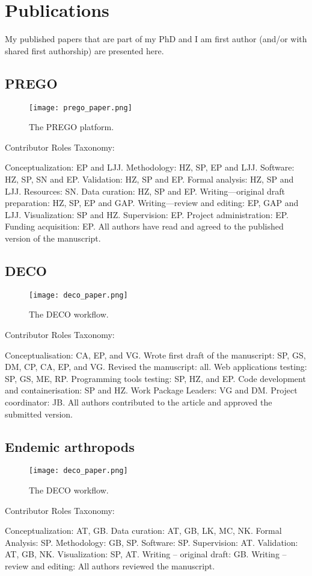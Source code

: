 \chapter{Publications}
\label{app:publications}

My published papers that are part of my PhD and I am first author (and/or with shared first authorship) are
presented here.
\section{PREGO}

\begin{figure}[hbt!] 
    \centering\texttt{[image: prego\_paper.png]}
\caption{The PREGO platform.}
    \label{fig:prego_paper}
\end{figure}

Contributor Roles Taxonomy:

Conceptualization: EP and LJJ.
Methodology: HZ, SP, EP and LJJ.
Software: HZ, SP, SN and EP.
Validation: HZ, SP and EP.
Formal analysis: HZ, SP and LJJ.
Resources: SN.
Data curation: HZ, SP and EP.
Writing—original draft preparation: HZ, SP, EP and GAP.
Writing—review and editing: EP, GAP and LJJ.
Visualization: SP and HZ.
Supervision: EP.
Project administration: EP.
Funding acquisition: EP.
All authors have read and agreed to the published version of the manuscript.


\section{DECO}

\begin{figure}[hbt!] 
    \centering\texttt{[image: deco\_paper.png]}
\caption{The DECO workflow.}
    \label{fig:deco_paper}
\end{figure}

Contributor Roles Taxonomy:

Conceptualisation: CA, EP, and VG.
Wrote first draft of the manuscript: SP, GS, DM, CP, CA, EP, and VG.
Revised the manuscript: all.
Web applications testing: SP, GS, ME, RP.
Programming tools testing: SP, HZ, and EP.
Code development and containerisation: SP and HZ.
Work Package Leaders: VG and DM.
Project coordinator: JB.
All authors contributed to the article and approved the submitted version.

\section{Endemic arthropods}

\begin{figure}[hbt!] 
    \centering\texttt{[image: deco\_paper.png]}
\caption{The DECO workflow.}
    \label{fig:deco_paper}
\end{figure}

Contributor Roles Taxonomy:

Conceptualization: AT, GB.
Data curation: AT, GB, LK, MC, NK.
Formal Analysis: SP.
Methodology: GB, SP.
Software: SP.
Supervision: AT.
Validation: AT, GB, NK.
Visualization: SP, AT.
Writing – original draft: GB.
Writing – review and editing: All authors reviewed the manuscript.

